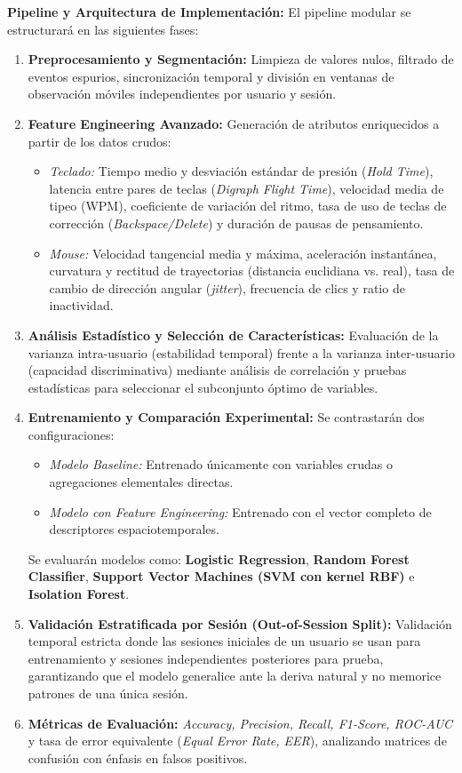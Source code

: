 \documentclass[10pt,letterpaper]{article}
\begin{document}
\textbf{Pipeline y Arquitectura de Implementación:}
El pipeline modular se estructurará en las siguientes fases:
\begin{enumerate}
    \item \textbf{Preprocesamiento y Segmentación:} Limpieza de valores nulos, filtrado de eventos espurios, sincronización temporal y división en ventanas de observación móviles independientes por usuario y sesión.
    \item \textbf{Feature Engineering Avanzado:} Generación de atributos enriquecidos a partir de los datos crudos:
    \begin{itemize}
        \item \textit{Teclado:} Tiempo medio y desviación estándar de presión (\textit{Hold Time}), latencia entre pares de teclas (\textit{Digraph Flight Time}), velocidad media de tipeo (WPM), coeficiente de variación del ritmo, tasa de uso de teclas de corrección (\textit{Backspace/Delete}) y duración de pausas de pensamiento.
        \item \textit{Mouse:} Velocidad tangencial media y máxima, aceleración instantánea, curvatura y rectitud de trayectorias (distancia euclidiana vs. real), tasa de cambio de dirección angular (\textit{jitter}), frecuencia de clics y ratio de inactividad.
    \end{itemize}
    \item \textbf{Análisis Estadístico y Selección de Características:} Evaluación de la varianza intra-usuario (estabilidad temporal) frente a la varianza inter-usuario (capacidad discriminativa) mediante análisis de correlación y pruebas estadísticas para seleccionar el subconjunto óptimo de variables.
    \item \textbf{Entrenamiento y Comparación Experimental:} Se contrastarán dos configuraciones:
    \begin{itemize}
        \item \textit{Modelo Baseline:} Entrenado únicamente con variables crudas o agregaciones elementales directas.
        \item \textit{Modelo con Feature Engineering:} Entrenado con el vector completo de descriptores espaciotemporales.
    \end{itemize}
    Se evaluarán modelos como: \textbf{Logistic Regression}, \textbf{Random Forest Classifier}, \textbf{Support Vector Machines (SVM con kernel RBF)} e \textbf{Isolation Forest}.
    \item \textbf{Validación Estratificada por Sesión (Out-of-Session Split):} Validación temporal estricta donde las sesiones iniciales de un usuario se usan para entrenamiento y sesiones independientes posteriores para prueba, garantizando que el modelo generalice ante la deriva natural y no memorice patrones de una única sesión.
    \item \textbf{Métricas de Evaluación:} \textit{Accuracy, Precision, Recall, F1-Score, ROC-AUC} y tasa de error equivalente (\textit{Equal Error Rate, EER}), analizando matrices de confusión con énfasis en falsos positivos.
\end{enumerate}
\end{document}
